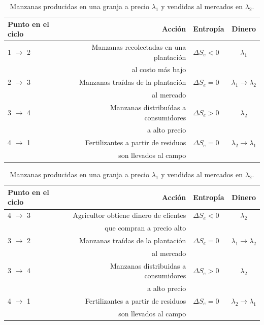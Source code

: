 \begin{table}	
\hskip-4.0cm\begin{tabular}{ |l |r | l | c| }
		\hline
		Punto en el ciclo &  Acción & Entropía & Dinero  \\ \hline
		1 $\rightarrow$ 2 & Manzanas recolectadas en una plantación  & $\Delta S_{e} < 0 $ &  $\lambda_{1}$ \\
		 &  al costo más bajo & &   \\ \hline
		2 $\rightarrow$ 3 & Manzanas traídas de la plantación & $\Delta S_{e} = 0 $ & $\lambda_{1} \rightarrow \lambda_{2}$\\ 
		 &  al mercado  &  & \\ \hline
		3 $\rightarrow$ 4 &  Manzanas distribuídas a consumidores   &$\Delta S_{e} > 0 $ & $\lambda_{2}$ \\  
		&  a alto precio   & & \\  \hline
		4 $\rightarrow$ 1 & Fertilizantes a partir de residuos &  $\Delta S_{e} = 0 $  &  $\lambda_{2} \rightarrow \lambda_{1}$\\  
		 &  son llevados al campo &   &  \\  
		\hline
	\end{tabular}
	\label{tab_manzanas}
	\caption{Manzanas producidas en una granja a precio $\lambda_{1}$ y vendidas al mercados en $\lambda_{2}$. }
\end{table}


\begin{table}	
	\hskip-4.0cm\begin{tabular}{ |l |r | l | c| }
		\hline
		Punto en el ciclo &  Acción & Entropía & Dinero  \\ \hline
		4 $\rightarrow$ 3 & Agricultor obtiene dinero de clientes & $\Delta S_{e} < 0 $ &  $\lambda_{2}$ \\
		& que compran a precio alto & & \\ \hline
		3 $\rightarrow$ 2 & Manzanas traídas de la plantación   & $\Delta S_{e} = 0 $ & $\lambda_{1} \rightarrow \lambda_{2}$\\ 
		& al mercado  &  & \\ \hline
		3 $\rightarrow$ 4 &  Manzanas distribuidas a consumidores  &$\Delta S_{e} > 0 $ & $\lambda_{2}$ \\
		& a alto precio   & &  \\  \hline
		4 $\rightarrow$ 1 & Fertilizantes a partir de residuos &  $\Delta S_{e} = 0 $  &  $\lambda_{2} \rightarrow \lambda_{1}$\\  
		&  son llevados al campo &  &  \\  
		\hline
	\end{tabular}
	\label{tab_dineroManzana}
	\caption{Manzanas producidas en una granja a precio $\lambda_{1}$ y vendidas al mercados en $\lambda_{2}$. }
\end{table}